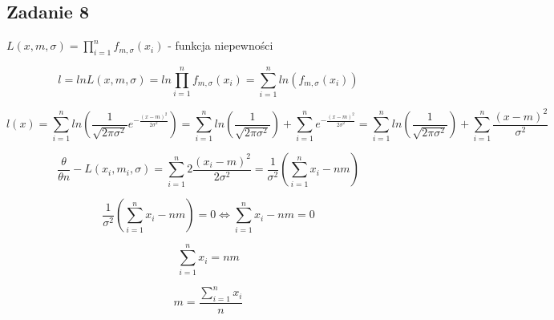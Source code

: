 \subsection{Zadanie 8}

$L(x,m,\sigma)=\displaystyle\prod\limits_{i=1}^n f_{m,\sigma} (x_i)$ - funkcja niepewności

$$l=ln L(x,m,\sigma)=ln \displaystyle\prod\limits_{i=1}^n f_{m,\sigma} (x_i)=\displaystyle\sum\limits_{i=1}^n ln(f_{m,\sigma} (x_i))$$

$$l(x)=\displaystyle\sum\limits_{i=1}^n ln(\frac{1}{\sqrt{2\pi\sigma^2}}e^{-\frac{(x-m)^2}{2\sigma^2}})=\displaystyle\sum\limits_{i=1}^n ln (\frac{1}{\sqrt{2\pi\sigma^2}})+\displaystyle\sum\limits_{i=1}^n e^{-\frac{(x-m)^2}{2\sigma^2}}=\displaystyle\sum\limits_{i=1}^n ln (\frac{1}{\sqrt{2\pi\sigma^2}})+\displaystyle\sum\limits_{i=1}^n {\frac{(x-m)^2}{\sigma^2}}$$

$${\frac{\theta}{\theta n}}-L(x_i,m_i,\sigma)=\displaystyle\sum\limits_{i=1}^n 2{\frac{(x_i-m)^2}{2\sigma^2}}={\frac{1}{\sigma^2}}(\displaystyle\sum\limits_{i=1}^n x_i-nm)$$

$${\frac{1}{\sigma^2}}(\displaystyle\sum\limits_{i=1}^n x_i-nm)=0 \Leftrightarrow\displaystyle\sum\limits_{i=1}^n x_i-nm=0$$

$$\displaystyle\sum\limits_{i=1}^n x_i=nm$$

$$m={\frac{\displaystyle\sum\limits_{i=1}^n x_i}{n}}$$
